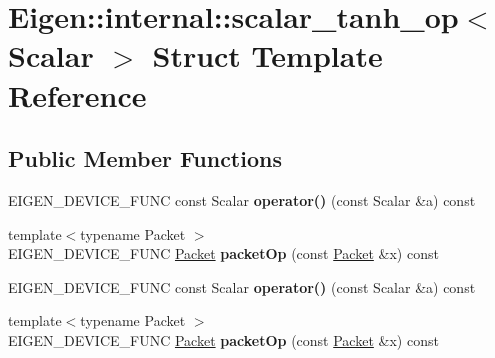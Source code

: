 \hypertarget{struct_eigen_1_1internal_1_1scalar__tanh__op}{}\section{Eigen\+:\+:internal\+:\+:scalar\+\_\+tanh\+\_\+op$<$ Scalar $>$ Struct Template Reference}
\label{struct_eigen_1_1internal_1_1scalar__tanh__op}
\subsection*{Public Member Functions}
\begin{DoxyCompactItemize}
\item 
\mbox{\label{struct_eigen_1_1internal_1_1scalar__tanh__op_ad5f9d64ebea18a798012e67bb4a4c894}} 
E\+I\+G\+E\+N\+\_\+\+D\+E\+V\+I\+C\+E\+\_\+\+F\+U\+NC const Scalar {\bfseries operator()} (const Scalar \&a) const
\item 
\mbox{\label{struct_eigen_1_1internal_1_1scalar__tanh__op_a5a42ae6b52110e5c3671bdf0fd1becc6}} 
{\footnotesize template$<$typename Packet $>$ }\\E\+I\+G\+E\+N\+\_\+\+D\+E\+V\+I\+C\+E\+\_\+\+F\+U\+NC \hyperlink{union_eigen_1_1internal_1_1_packet}{Packet} {\bfseries packet\+Op} (const \hyperlink{union_eigen_1_1internal_1_1_packet}{Packet} \&x) const
\item 
\mbox{\label{struct_eigen_1_1internal_1_1scalar__tanh__op_ad5f9d64ebea18a798012e67bb4a4c894}} 
E\+I\+G\+E\+N\+\_\+\+D\+E\+V\+I\+C\+E\+\_\+\+F\+U\+NC const Scalar {\bfseries operator()} (const Scalar \&a) const
\item 
\mbox{\label{struct_eigen_1_1internal_1_1scalar__tanh__op_a5a42ae6b52110e5c3671bdf0fd1becc6}} 
{\footnotesize template$<$typename Packet $>$ }\\E\+I\+G\+E\+N\+\_\+\+D\+E\+V\+I\+C\+E\+\_\+\+F\+U\+NC \hyperlink{union_eigen_1_1internal_1_1_packet}{Packet} {\bfseries packet\+Op} (const \hyperlink{union_eigen_1_1internal_1_1_packet}{Packet} \&x) const
\end{DoxyCompactItemize}


